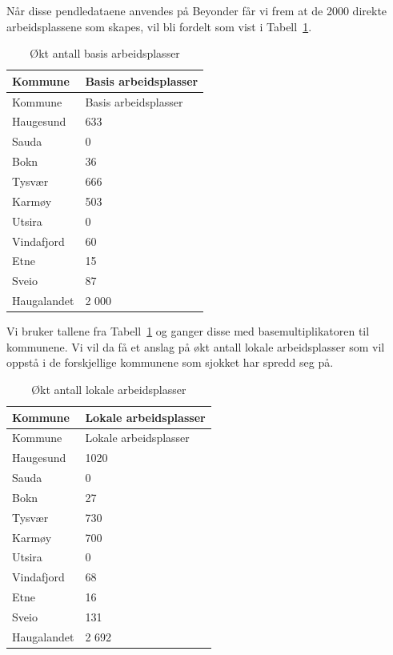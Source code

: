 \documentclass[
]{article}
\begin{document}
Når disse pendledataene anvendes på Beyonder får vi frem at de 2000
direkte arbeidsplassene som skapes, vil bli fordelt som vist i
Tabell~\ref{tbl-direkte}.

\hypertarget{tbl-direkte}{}
\begin{longtable}[]{@{}ll@{}}
\caption{\label{tbl-direkte}Økt antall basis
arbeidsplasser}\tabularnewline
\toprule()
Kommune & Basis arbeidsplasser \\
\midrule()
\endfirsthead
\toprule()
Kommune & Basis arbeidsplasser \\
\midrule()
\endhead
Haugesund & 633 \\
Sauda & 0 \\
Bokn & 36 \\
Tysvær & 666 \\
Karmøy & 503 \\
Utsira & 0 \\
Vindafjord & 60 \\
Etne & 15 \\
Sveio & 87 \\
Haugalandet & 2 000 \\
\bottomrule()
\end{longtable}

Vi bruker tallene fra Tabell~\ref{tbl-direkte} og ganger disse med
basemultiplikatoren til kommunene. Vi vil da få et anslag på økt antall
lokale arbeidsplasser som vil oppstå i de forskjellige kommunene som
sjokket har spredd seg på.

\hypertarget{tbl-indirekte}{}
\begin{longtable}[]{@{}ll@{}}
\caption{\label{tbl-indirekte}Økt antall lokale
arbeidsplasser}\tabularnewline
\toprule()
Kommune & Lokale arbeidsplasser \\
\midrule()
\endfirsthead
\toprule()
Kommune & Lokale arbeidsplasser \\
\midrule()
\endhead
Haugesund & 1020 \\
Sauda & 0 \\
Bokn & 27 \\
Tysvær & 730 \\
Karmøy & 700 \\
Utsira & 0 \\
Vindafjord & 68 \\
Etne & 16 \\
Sveio & 131 \\
Haugalandet & 2 692 \\
\bottomrule()
\end{longtable}
\end{document}
